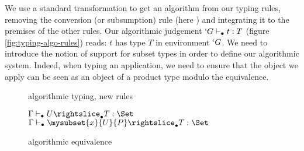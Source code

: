 \documentclass{llncs}
\renewcommand{\SubSubAs}[1][\Gamma]{%
\UAX{SubSub}
{$\subalgoimpl{#1}{c}{U}{T}{\Set}$}
{$\subalgoimpl{#1}{c[\eltpit~\ctxdot]}{\mysubset{x}{U}{P}}{T}{\Set}$}
{}
}
\begin{document}
\begin{paragraph}{}
We use a standard transformation to get an algorithm from our typing
rules, removing the conversion (or subsumption) rule
(here ) and integrating it to the premises of the other rules.
Our algorithmic judgement $`G \vdash_{\bullet} t : T$
(figure \vref{fig:typing-algo-rules})
reads: $t$ has type $T$ in environment $`G$.
We need to introduce the notion of support for subset types in order to
define our algorithmic system. Indeed, when typing an application, 
we need to ensure that the object we apply can be seen as an object of a
product type modulo the equivalence. 
\begin{figure*}[t]
  \def\infvspace{0.5em}
    \def\type{\typea}
    \def\subt{\subta}
    \def\sub{\suba}
    \def\fCenter{\typea}
    \begin{center}

    \vspace{\infvspace}
    \AppA\DP
    
    \vspace{\infvspace}
    \SumDepA\DP

    \vspace{\infvspace}
    \PiLeftA\DP
    \quad\hspace{-2.5em}
    \PiRightA\DP
  \end{center}  
  \caption{\Russell{} algorithmic typing, new rules}
  \label{fig:typing-algo-rules}  
\end{figure*}


\begin{figure*}
    \def\fCenter{\suba}
    \def\type{\typea}
    \def\sub{\suba}
    \begin{center}
    \SubConvA\DP 

    \vspace{\infvspace}
    \SubHnfA\DP

    \vspace{\infvspace}
    \SubProdA\DP

    \vspace{\infvspace}
    \SubSigmaA\DP

    \vspace{\infvspace}
    \SubProofA\DP

    \vspace{\infvspace}
    \SubSubAs\DP
  \end{center}  
  \caption{\Russell{} algorithmic equivalence}
  \label{fig:subtyping-algo-rules}  
\end{figure*}


\end{paragraph}
\end{document}
